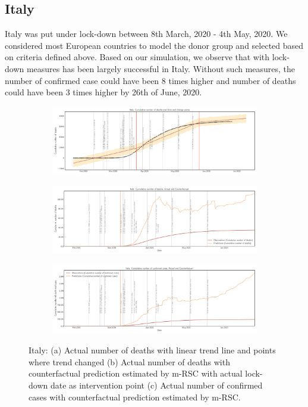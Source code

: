 \documentclass[preprint,authoryear,12pt]{elsarticle}
\begin{document}
	
	\subsection{Italy}
	 Italy was put under lock-down between 8th March, 2020 - 4th May, 2020. We considered most European countries to model the donor group and selected based on criteria defined above. Based on our simulation, we observe that with lock-down measures  has been largely successful in Italy. Without such measures, the number of confirmed case could have been 8 times higher and number of deaths could have been 3 times higher by 26th of June, 2020.
	 
		\begin{figure}
		\centering
		\begin{subfigure}[b]{\textwidth}
			\centering
			\includegraphics[width=0.9\linewidth,height=0.2\textheight]{Italy_deaths_trend}
		\end{subfigure}
		
		\begin{subfigure}[b]{\textwidth}
			\centering
			\includegraphics[width=0.9\linewidth,height=0.2\textheight]{Italy_deaths}
		\end{subfigure}
		
		\begin{subfigure}[b]{\textwidth}
			\centering
			\includegraphics[width=0.9\linewidth,height=0.2\textheight]{Italy_confirmed cases}
		\end{subfigure}
		
		\caption[Italy]{Italy: (a) Actual number of deaths with linear trend line and points where trend changed (b) Actual number of deaths with counterfactual prediction estimated by m-RSC with actual lock-down date as intervention point (c) Actual number of confirmed cases with counterfactual prediction estimated by m-RSC.}
		\label{fig6} 
	\end{figure}
\end{document}

